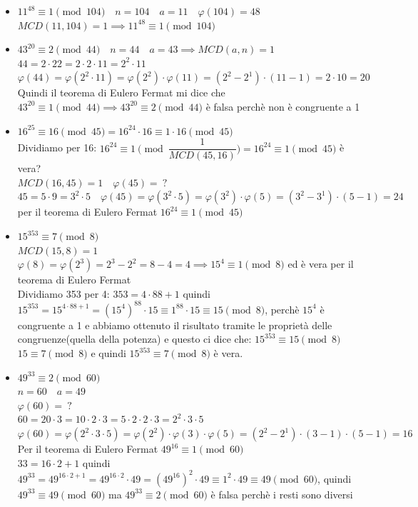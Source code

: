 \documentclass[12pt, letterpaper]{report}
\begin{document}
		\begin{itemize}
			\item $11^{48} \equiv 1 \pmod{104} \quad n = 104 \quad a = 11 \quad \varphi(104) = 48$ \\
			$MCD(11,104) = 1 \implies 11^{48} \equiv 1 \pmod{104}$
			\item $43^{20} \equiv 2 \pmod{44} \quad n = 44 \quad a = 43 \implies MCD(a, n) = 1$ \\
			$44 = 2 \cdot 22 = 2 \cdot 2 \cdot 11 = 2^2 \cdot 11$ \\
			$\varphi(44) = \varphi(2^2 \cdot 11) = \varphi(2^2) \cdot \varphi(11) = (2^2 - 2^1) \cdot (11 - 1) = 2 \cdot 10 = 20$ \\
			Quindi il teorema di Eulero Fermat mi dice che $43^{20} \equiv 1 \pmod{44} \implies 43^{20} \equiv 2 \pmod{44}$ è falsa perchè non è congruente a 1
			\item $16^{25} \equiv 16 \pmod{45} = 16^{24} \cdot 16 \equiv 1 \cdot 16 \pmod{45}$ \\
			Dividiamo per 16: $16^{24} \equiv 1 \pmod{\dfrac{1}{MCD(45,16)}} = 16^{24} \equiv 1 \pmod{45}$ è vera? \\
			$MCD(16, 45) = 1 \quad \varphi(45) =\ ?$ \\
			$45 = 5 \cdot 9 = 3^2 \cdot 5 \quad \varphi(45) = \varphi(3^2 \cdot 5) = \varphi(3^2) \cdot \varphi(5) = (3^2 - 3^1) \cdot (5 - 1) = 24$ per il teorema di Eulero Fermat $16^{24} \equiv 1 \pmod{45}$
			\item $15^{353} \equiv 7 \pmod{8}$ \\
			$MCD(15, 8) = 1$ \\
			$\varphi(8) = \varphi(2^3) = 2^3 - 2^2 = 8-4 = 4 \implies 15^4 \equiv 1 \pmod{8}$ ed è vera per il teorema di Eulero Fermat \\
			Dividiamo 353 per 4: $353 = 4 \cdot 88 + 1$ quindi $15^{353} = 15^{4 \cdot 88 + 1} = (15^4)^{88} \cdot 15 \equiv 1^{88} \cdot 15 \equiv 15 \pmod{8}$, perchè $15^4$ è congruente a 1 e abbiamo ottenuto il risultato tramite le proprietà delle congruenze(quella della potenza) e questo ci dice che: $15^{353} \equiv 15 \pmod{8}$ \\
			$15 \equiv 7 \pmod{8}$ e quindi $15^{353} \equiv 7 \pmod{8}$ è vera.
			\item $49^{33} \equiv 2 \pmod{60}$ \\
			$n = 60 \quad a = 49$ \\
			$\varphi(60) =\ ?$ \\
			$60 = 20 \cdot 3 = 10 \cdot 2 \cdot 3 = 5 \cdot 2 \cdot 2 \cdot 3 = 2^2 \cdot 3 \cdot 5$ \\
			$\varphi(60) = \varphi(2^2 \cdot 3 \cdot 5) = \varphi(2^2) \cdot \varphi(3) \cdot \varphi(5) = (2^2 -2^1) \cdot (3-1) \cdot (5-1) = 16$ \\
			Per il teorema di Eulero Fermat $49^{16} \equiv 1 \pmod{60}$ \\
			$33 = 16 \cdot 2 + 1$ quindi $49^{33} = 49^{16 \cdot 2  + 1} = 49^{16 \cdot 2} \cdot 49 = (49^{16})^2 \cdot 49 \equiv 1^2 \cdot 49 \equiv 49 \pmod{60}$, quindi $49^{33} \equiv 49 \pmod{60}$ ma $49^{33} \equiv 2 \pmod{60}$ è falsa perchè i resti sono diversi
		\end{itemize}
\end{document}
